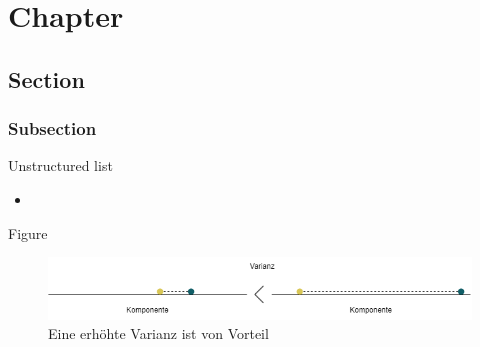 \documentclass[envcountsame, envcountchap, deutsch]{i-studis}
\begin{document}
\setcounter{tocdepth}{4}
\setcounter{secnumdepth}{4}
\title{} %
\address{im Studiengang Wirtschaftsinformatik an der\\Hochschule Trier}

\author{Niklas Metzen}
\matrikelnummer{}

\mytitlepage{}

\frontmatter
\tableofcontents					%
\listoffigures                        %
\listoftables                           %
\mainmatter{}


\chapter{Chapter} %
\section{Section} %
\subsection{Subsection} %
Unstructured list
\begin{itemize} %
    \item %
\end{itemize}


\vspace{1ex}
Figure
\begin{figure} %
    \includegraphics[width=\textwidth]{comparison_variance_two_points.drawio.png} %
    \caption{Eine erhöhte Varianz ist von Vorteil}\label{fig:var_max} %
\end{figure}
\end{document}
